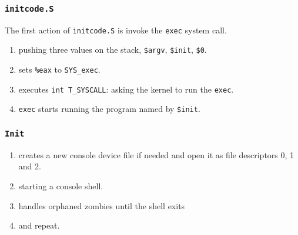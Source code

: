 \documentclass{beamer}
\begin{document}

\begin{frame}[t]
  \frametitle{\texttt{initcode.S}}
  The first action of \texttt{initcode.S} is invoke the \texttt{exec} system call.

  \begin{enumerate}
  \item pushing three values on the stack, \texttt{\$argv}, \texttt{\$init}, \texttt{\$0}.
  \item sets \texttt{\%eax} to \texttt{SYS\_exec}.
  \item executes \texttt{int T\_SYSCALL}: asking the kernel to run the \texttt{exec}.
  \item \texttt{exec} starts running the program named by \texttt{\$init}.
  \end{enumerate}
  
\end{frame}


\begin{frame}[t]
  \frametitle{\texttt{Init}}

  \begin{enumerate}
  \item creates a new console device file if needed and open it as
    file descriptors 0, 1 and 2.
  \item starting a console shell.
  \item handles orphaned zombies until the shell exits
  \item and repeat.
  \end{enumerate}

\end{frame}
\end{document}
